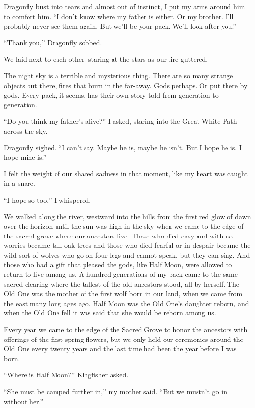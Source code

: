 Dragonfly bust into tears and almost out of instinct, I put my arms around him to comfort him. ``I don't know where my father is either. Or my brother. I'll probably never see them again. But we'll be your pack. We'll look after you.''

``Thank you,'' Dragonfly sobbed.

We laid next to each other, staring at the stars as our fire guttered.

The night sky is a terrible and mysterious thing. There are so many strange objects out there, fires that burn in the far-away. Gods perhaps. Or put there by gods. Every pack, it seems, has their own story told from generation to generation.

``Do you think my father's alive?'' I asked, staring into the Great White Path across the sky.

Dragonfly sighed. ``I can't say. Maybe he is, maybe he isn't. But I hope he is. I hope mine is.''

I felt the weight of our shared sadness in that moment, like my heart was caught in a snare.

``I hope so too,'' I whispered.

\secdiv

We walked along the river, westward into the hills from the first red glow of dawn over the horizon until the sun was high in the sky when we came to the edge of the sacred grove where our ancestors live. Those who died easy and with no worries became tall oak trees and those who died fearful or in despair became the wild sort of wolves who go on four legs and cannot speak, but they can sing. And those who had a gift that pleased the gods, like Half Moon, were allowed to return to live among us. A hundred generations of my pack came to the same sacred clearing where the tallest of the old ancestors stood, all by herself. The Old One was the mother of the first wolf born in our land, when we came from the east many long ages ago. Half Moon was the Old One's daughter reborn, and when the Old One fell it was said that she would be reborn among us.

Every year we came to the edge of the Sacred Grove to honor the ancestors with offerings of the first spring flowers, but we only held our ceremonies around the Old One every twenty years and the last time had been the year before I was born.

``Where is Half Moon?'' Kingfisher asked.

``She must be camped further in,'' my mother said. ``But we mustn't go in without her.''

